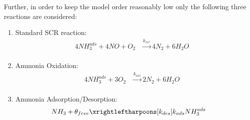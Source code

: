 Further, in order to keep the model order reasonably low only the following
three reactions are considered:
\begin{enumerate}
    \item Standard SCR reaction:
    \begin{align}
        4 NH_3 ^{ads} + 4 NO + O_2 &\xrightarrow[]{k_{scr}} 4 N_2 + 6 H_2O \label{eqn::std_scr}
    \end{align}
    \item Ammonia Oxidation:
    \begin{align}
        4 NH_3^{ads} + 3 O_2 &\xrightarrow[]{k_{oxi}} 2 N_2 + 6 H_2O \label{eqn::amox}
    \end{align}
    \item Ammonia Adsorption/Desorption:
        \begin{align}
            NH_3 + \theta_{free} &\xrightleftharpoons[k_{des}]{k_{ads}} NH_3^{ads}
            \label{eqn::ads}
        \end{align}
\end{enumerate}
